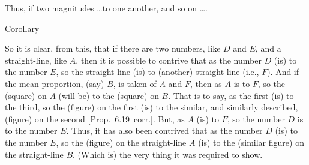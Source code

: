 \begin{Parallel}{}{}
{Thus,  if two magnitudes \ldots to one another, and so on \ldots.\\

\begin{center}
{\large Corollary}
\end{center}\vspace*{-7pt}

So it is clear, from this, that if there are two numbers, like $D$ and $E$, and
a straight-line, like $A$, then it is possible to contrive that as the number $D$ (is)
to the number $E$, so the straight-line (is) to (another) straight-line ({\rm i.e.,} $F$). And if the mean proportion, (say) $B$,  is taken of $A$ and $F$, 
then as $A$ is to $F$, so the (square) on $A$ (will be) to the (square)
on $B$. That is to say, as the first (is) to the third, so the
(figure) on the first (is) to the similar, and similarly described, (figure) on the second [Prop.~6.19~corr.]. But, as $A$ (is) to
$F$, so the number $D$ is to the number $E$. Thus, it has also been contrived
that as the number $D$ (is) to the number $E$, so the (figure) on the
straight-line $A$ (is) to the (similar figure) on the straight-line $B$. (Which is)
the very thing it was required to show.}
\end{Parallel}

